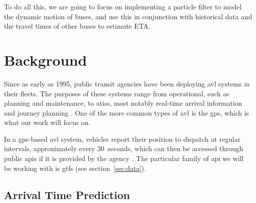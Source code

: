 \documentclass[12pt,a4paper]{article}
\begin{document}
To do all this, we are going to focus on implementing a particle filter to model the dynamic motion of buses,
and use this in conjunction with historical data and the travel times of other buses to estimate ETA.



\section{Background}
\label{sec:background}












Since as early as 1995, public transit agencies have been deploying \gls{avl} systems
in their fleets.
The purposes of these systems range from operational, such as planning and maintenance, 
to \glspl{atis}, most notably real-time arrival information and journey planning
\citep{tcrp:2003}.
One of the more common types of \gls{avl} is the \gls{gps},
which is what our work will focus on.


In a \gls{gps}-based \gls{avl} system, vehicles report their position to dispatch
at regular intervals, approximately every 30~seconds,
which can then be accessed through public \glspl{api} if it is provided by the agency
\citep{tcrp:2003}.
The particular family of \gls{api} we will be working with is \gls{gtfs}
(see section~\ref{sec:data}).



\subsection{Arrival Time Prediction}
\end{document}
